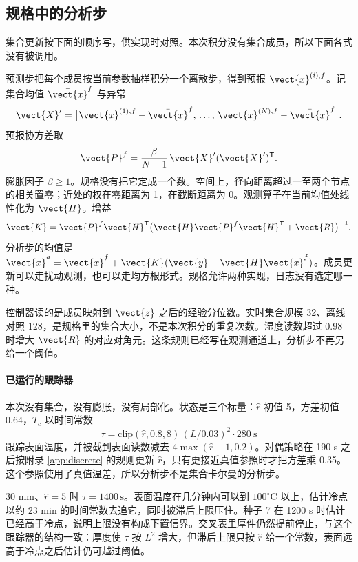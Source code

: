 \subsection{规格中的分析步}

集合更新按下面的顺序写，供实现时对照。本次积分没有集合成员，所以下面各式没有被调用。

预测步把每个成员按当前参数抽样积分一个离散步，得到预报 \(\vect{x}^{(i),f}\)。记集合均值 \(\bar{\vect{x}}^{f}\) 与异常
\[
\vect{X}'=\big[\vect{x}^{(1),f}-\bar{\vect{x}}^{f},\,\ldots,\,\vect{x}^{(N),f}-\bar{\vect{x}}^{f}\big].
\]
预报协方差取
\begin{equation}
\label{eq:enkf}
\vect{P}^{f}=\frac{\beta}{N-1}\,\vect{X}'(\vect{X}')^{\mathsf T}.
\end{equation}
膨胀因子 \(\beta\ge 1\)。规格没有把它定成一个数。空间上，径向距离超过一至两个节点的相关置零；近处的权在零距离为 1，在截断距离为 0。观测算子在当前均值处线性化为 \(\vect{H}\)。增益
\[
\vect{K}=\vect{P}^{f}\vect{H}^{\mathsf T}
\big(\vect{H}\vect{P}^{f}\vect{H}^{\mathsf T}+\vect{R}\big)^{-1}.
\]
分析步的均值是 \(\bar{\vect{x}}^{a}=\bar{\vect{x}}^{f}+\vect{K}(\vect{y}-\vect{H}\bar{\vect{x}}^{f})\)。成员更新可以走扰动观测，也可以走均方根形式。规格允许两种实现，日志没有选定哪一种。

控制器读的是成员映射到 \(\vect{z}\) 之后的经验分位数。实时集合规模 32、离线对照 128，是规格里的集合大小，不是本次积分的重复次数。湿度读数超过 0.98 时增大 \(\vect{R}\) 的对应对角元。这条规则已经写在观测通道上，分析步不再另给一个阈值。

\paragraph{已运行的跟踪器}
本次没有集合，没有膨胀，没有局部化。状态是三个标量：\(\hat r\) 初值 5，方差初值 0.64，\(\hat T_c\) 以时间常数
\begin{equation}
\tau=\mathrm{clip}(\hat r,0.8,8)\,(L/0.03)^2\cdot 280\ \mathrm{s}
\end{equation}
跟踪表面温度，并被截到表面读数减去 \(4\max(\hat r-1,0.2)\)。对偶策略在 190 s 之后按附录 \ref{app:discrete} 的规则更新 \(\hat r\)，只有更接近真值参照时才把方差乘 0.35。这个参照使用了真值温差，所以分析步不是集合卡尔曼的分析步。

30 mm、\(\hat r=5\) 时 \(\tau=1400\,\mathrm{s}\)。表面温度在几分钟内可以到 \(100^\circ\mathrm{C}\) 以上，估计冷点以约 23 min 的时间常数去追它，同时被滞后上限压住。种子 7 在 1200 s 时估计已经高于冷点，说明上限没有构成下置信界。交叉表里厚件仍然提前停止，与这个跟踪器的结构一致：厚度使 \(\tau\) 按 \(L^2\) 增大，但滞后上限只按 \(\hat r\) 给一个常数，表面远高于冷点之后估计仍可越过阈值。

